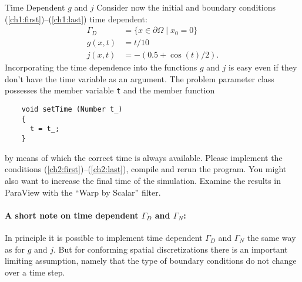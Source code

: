 \documentclass[12pt,a4paper]{article}
\begin{document}
\begin{Exercise}{Time Dependent $g$ and $j$}
  Consider now the initial and boundary conditions
  (\ref{ch1:first})--(\ref{ch1:last}) time dependent:
  \begin{align}
    \label{ch2:first}
    \Gamma_D &= \{ x\in\partial\Omega \mid x_0 = 0 \} \\
    g(x,t) &= t/10 \\
    \label{ch2:last}
    j(x,t) &= -(0.5 + \cos(t)/2) .
  \end{align}
  Incorporating the time dependence into the functions $g$ and $j$ is
  easy even if they don't have the time variable as an argument. The
  problem parameter class possesses the member variable \lstinline!t!
  and the member function
  \begin{lstlisting}
    void setTime (Number t_)
    {
      t = t_;
    }
  \end{lstlisting}
  by means of which the correct time is always available. Please
  implement the conditions (\ref{ch2:first})--(\ref{ch2:last}), compile
  and rerun the program. You might also want to increase the final time
  of the simulation. Examine the results in ParaView with the ``Warp by
  Scalar'' filter.
  \paragraph{A short note on time dependent $\Gamma_D$ and $\Gamma_N$:}
  In principle it is possible to implement time dependent $\Gamma_D$ and
  $\Gamma_N$ the same way as for $g$ and $j$. But for conforming spatial
  discretizations there is an important limiting assumption, namely that
  the type of boundary conditions do not change over a time step.
\end{Exercise}
\end{document}

